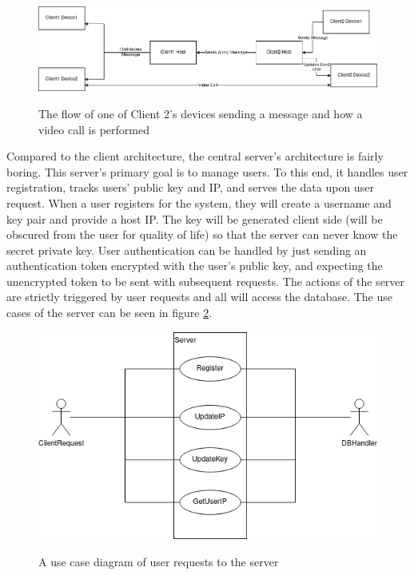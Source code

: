 \documentclass[titlepage]{article}
\begin{document}
      \begin{center}
          \begin{figure}[!ht]
              \includegraphics[scale=.5]{graphics/clientHost.png}
              \label{clientHost}
              \caption{The flow of one of Client 2's devices sending a message and how a video call is performed}
          \end{figure}
      \end{center}

      Compared to the client architecture, the central server's architecture is fairly boring.
      This server's primary goal is to manage users.
      To this end, it handles user registration, tracks users' public key and IP, and serves the data upon user request.
      When a user registers for the system, they will create a username and key pair and provide a host IP.
      The key will be generated client side (will be obscured from the user for quality of life) so that the server can never know the secret private key.
      User authentication can be handled by just sending an authentication token encrypted with the user's public key, and expecting the unencrypted token to be sent with subsequent requests.
      The actions of the server are strictly triggered by user requests and all will access the database.
      The use cases of the server can be seen in figure \ref{serverUse}.

      \begin{center}
          \begin{figure}[!ht]
              \includegraphics[scale=.5]{graphics/ServerUseCase.png}
              \label{serverUse}
              \caption{A use case diagram of user requests to the server}
          \end{figure}
      \end{center}
\end{document}

